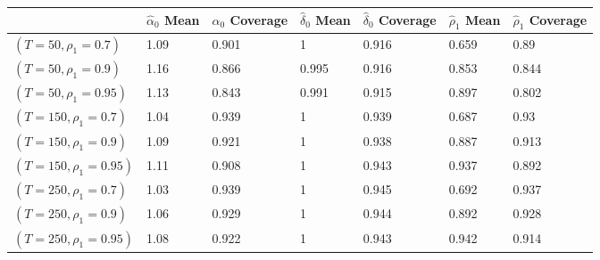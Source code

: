 \begin{tabular}{lllllll}
& $\hat{\alpha}_0$ Mean & $\hat{\alpha}_0$ Coverage & $\hat{\delta}_0$ Mean & $\hat{\delta}_0$ Coverage & $\hat{\rho}_1$ Mean & $\hat{\rho}_1$ Coverage \\ 
\hline 
$(T=50,\rho_1=0.7)$ & 1.09 & 0.901 & 1 & 0.916 & 0.659 & 0.89 \\ 
$(T=50,\rho_1=0.9)$ & 1.16 & 0.866 & 0.995 & 0.916 & 0.853 & 0.844 \\ 
$(T=50,\rho_1=0.95)$ & 1.13 & 0.843 & 0.991 & 0.915 & 0.897 & 0.802 \\ 
$(T=150,\rho_1=0.7)$ & 1.04 & 0.939 & 1 & 0.939 & 0.687 & 0.93 \\ 
$(T=150,\rho_1=0.9)$ & 1.09 & 0.921 & 1 & 0.938 & 0.887 & 0.913 \\ 
$(T=150,\rho_1=0.95)$ & 1.11 & 0.908 & 1 & 0.943 & 0.937 & 0.892 \\ 
$(T=250,\rho_1=0.7)$ & 1.03 & 0.939 & 1 & 0.945 & 0.692 & 0.937 \\ 
$(T=250,\rho_1=0.9)$ & 1.06 & 0.929 & 1 & 0.944 & 0.892 & 0.928 \\ 
$(T=250,\rho_1=0.95)$ & 1.08 & 0.922 & 1 & 0.943 & 0.942 & 0.914 \\ 
\hline 
\end{tabular}